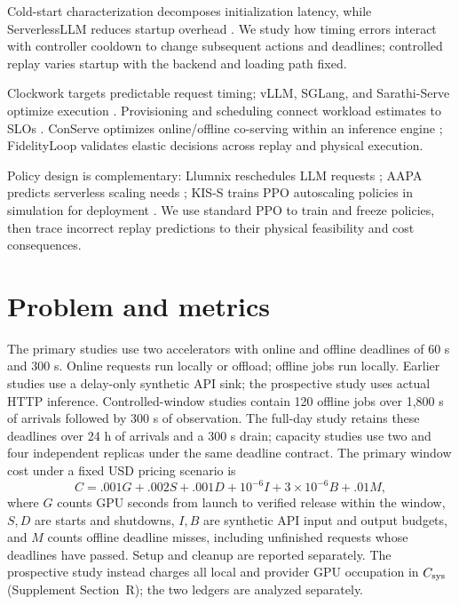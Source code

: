 Cold-start characterization decomposes initialization latency, while
ServerlessLLM reduces startup overhead
\citep{kabakibo2026coldstart,fu2024serverlessllm}. We study how timing errors
interact with controller cooldown to change subsequent actions and deadlines;
controlled replay varies startup with the backend and loading path fixed.

Clockwork targets predictable request timing; vLLM, SGLang, and Sarathi-Serve
optimize execution \citep{gujarati2020clockwork_arxiv,kwon2023vllm,zheng2024sglang,agrawal2024sarathi}.
Provisioning and scheduling connect workload estimates to SLOs
\citep{zhang2019mark,zhang2023shepherd}. ConServe optimizes online/offline
co-serving within an inference engine \citep{qiao2024conserve}; FidelityLoop
validates elastic decisions across replay and physical execution.

Policy design is complementary: Llumnix reschedules LLM requests
\citep{sun2024llumnix}; AAPA predicts serverless scaling needs
\citep{zhang2025aapa}; KIS-S trains PPO autoscaling policies in simulation
for deployment \citep{zhang2025kiss}. We use standard PPO
\citep{schulman2017ppo} to train and freeze policies, then trace incorrect
replay predictions to their physical feasibility and cost consequences.

\section{Problem and metrics}
The primary studies use two accelerators with online and offline deadlines of
60 s and 300 s. Online requests run locally or offload; offline jobs run
locally. Earlier studies use a delay-only synthetic API sink; the prospective
study uses actual HTTP inference. Controlled-window studies contain 120 offline
jobs over 1,800 s of arrivals followed by 300 s of observation. The full-day
study retains these deadlines over 24 h of arrivals and a 300 s drain;
capacity studies use two and four independent replicas under the same deadline contract.
The primary window cost under a fixed USD pricing scenario is
\begin{equation}
 C = .001 G + .002 S + .001 D + 10^{-6} I + 3\!\times\!10^{-6} B + .01 M,
\end{equation}
where $G$ counts GPU seconds from launch to verified release within the window,
$S,D$ are starts and shutdowns, $I,B$ are
synthetic API input and output budgets, and $M$ counts offline deadline misses,
including unfinished requests whose deadlines have passed. Setup and cleanup are reported separately. The prospective study instead
charges all local and provider GPU occupation in $C_{\rm sys}$
(Supplement Section~R); the two ledgers are analyzed separately.

